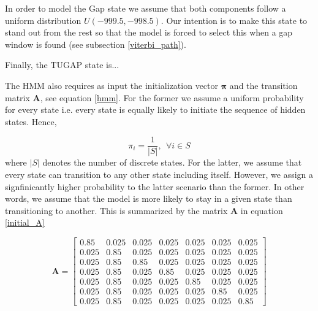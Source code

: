 In order to model the Gap state we assume that both components follow a uniform distribution $U(-999.5, -998.5)$. Our intention is to make this state to stand out from the rest so that the model is forced to  select this when a gap window is found (see subsection \ref{viterbi_path}).
 
Finally, the TUGAP state is... 


The HMM also requires as input the initialization vector $\boldsymbol{\pi}$ and the transition matrix $\mathbf{A}$, see equation \ref{hmm}. For the former we assume a uniform probability for every state i.e. every state is equally likely to initiate the sequence of hidden states. Hence, 

\begin{equation}
\pi_i = \frac{1}{|S|}, ~~ \forall i \in S
\end{equation}
where $|S|$ denotes the number of discrete states. For the latter,  we assume that every state can transition to any other state including itself. 
However, we assign a signfinicantly higher probability to the latter
scenario than the former. In other words, we assume that the model is more likely to stay in a given state than transitioning to another. This is summarized by the matrix $\mathbf{A}$ in equation \ref{initial_A}

\begin{equation}
\mathbf{A} = \begin{bmatrix}0.85 & 0.025 & 0.025 & 0.025 & 0.025 & 0.025 & 0.025 \\ 

0.025 & 0.85 & 0.025 & 0.025 & 0.025 & 0.025 & 0.025 \\
0.025 & 0.85 & 0.85 & 0.025 & 0.025 & 0.025 & 0.025 \\
0.025 & 0.85 & 0.025 & 0.85 & 0.025 & 0.025 & 0.025 \\
0.025 & 0.85 & 0.025 & 0.025 & 0.85 & 0.025 & 0.025 \\
0.025 & 0.85 & 0.025 & 0.025 & 0.025 & 0.85 & 0.025 \\
0.025 & 0.85 & 0.025 & 0.025 & 0.025 & 0.025 & 0.85 
\end{bmatrix}
\label{initial_A}
\end{equation}



 





